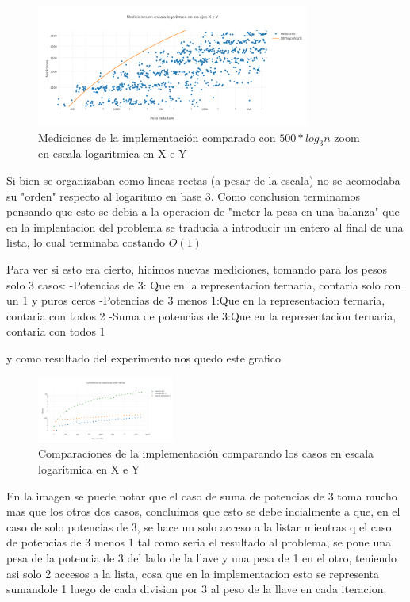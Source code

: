 \documentclass[spanish,12pt]{article}
\begin{document}
\begin{figure}[H]
\centering
\includegraphics[width=0.8\textwidth]{punto2-zoom}
\caption{Mediciones de la implementaci\'on comparado con $500*log_{3}{n}$ zoom en escala logaritmica en X e Y }
\end{figure}
Si bien se organizaban como lineas rectas (a pesar de la escala) no se acomodaba su "orden" respecto al logaritmo en base 3.
Como conclusion terminamos pensando que esto se debia a la operacion de "meter la pesa en una balanza" que en la implentacion del problema se traducia a introducir un entero al final de una lista, lo cual terminaba costando $O(1)$

Para ver si esto era cierto, hicimos nuevas mediciones, tomando para los pesos  solo 3 casos:
-Potencias de 3: Que en la representacion ternaria, contaria solo con un 1 y puros ceros
-Potencias de 3 menos 1:Que en la representacion ternaria, contaria con todos 2
-Suma de potencias de 3:Que en la representacion ternaria, contaria con todos 1

y como resultado del experimento nos quedo este grafico
\begin{figure}[H]
\centering
\includegraphics[width=0.4\textwidth]{punto2-comparaciones}
\caption{Comparaciones de la implementaci\'on comparando los casos en escala logaritmica en X e Y }
\end{figure}

En la imagen se puede notar que el caso de suma de potencias de 3 toma mucho mas que los otros dos casos, concluimos que esto se debe incialmente a que, en el caso de solo potencias de 3, se hace un solo acceso a la listar mientras q el caso de potencias de 3 menos 1
tal como seria el resultado al problema, se pone una pesa de la potencia de 3 del lado de la llave y una pesa de 1 en el otro, teniendo asi solo 2 accesos a la lista, cosa que en la implementacion esto se representa sumandole 1 luego de cada division por 3 al peso de la llave en cada iteracion.
\end{document}
